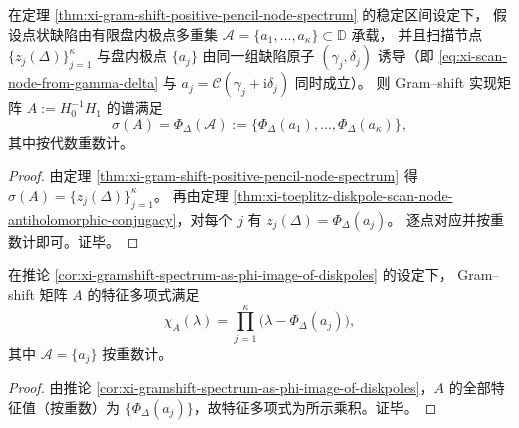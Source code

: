 \begin{corollary}\label{cor:xi-gramshift-spectrum-as-phi-image-of-diskpoles}
在定理 \ref{thm:xi-gram-shift-positive-pencil-node-spectrum} 的稳定区间设定下，
假设点状缺陷由有限盘内极点多重集 \(\mathcal A=\{a_1,\dots,a_\kappa\}\subset\mathbb{D}\) 承载，
并且扫描节点 \(\{z_j(\Delta)\}_{j=1}^{\kappa}\) 与盘内极点 \(\{a_j\}\) 由同一组缺陷原子 \((\gamma_j,\delta_j)\) 诱导（即 \eqref{eq:xi-scan-node-from-gamma-delta} 与 \(a_j=\mathcal{C}(\gamma_j+\mathrm{i}\delta_j)\) 同时成立）。
则 Gram--shift 实现矩阵 \(A:=H_0^{-1}H_1\) 的谱满足
\[
\sigma(A)=\Phi_\Delta(\mathcal A):=\{\Phi_\Delta(a_1),\dots,\Phi_\Delta(a_\kappa)\},
\]
其中按代数重数计。
\end{corollary}
\begin{proof}
由定理 \ref{thm:xi-gram-shift-positive-pencil-node-spectrum} 得 \(\sigma(A)=\{z_j(\Delta)\}_{j=1}^{\kappa}\)。
再由定理 \ref{thm:xi-toeplitz-diskpole-scan-node-antiholomorphic-conjugacy}，对每个 \(j\) 有 \(z_j(\Delta)=\Phi_\Delta(a_j)\)。
逐点对应并按重数计即可。证毕。
\end{proof}

\begin{proposition}\label{prop:xi-gramshift-charpoly-as-phi-image-of-diskpoles}
在推论 \ref{cor:xi-gramshift-spectrum-as-phi-image-of-diskpoles} 的设定下，
Gram--shift 矩阵 \(A\) 的特征多项式满足
\[
\chi_A(\lambda)=\prod_{j=1}^{\kappa}\bigl(\lambda-\Phi_\Delta(a_j)\bigr),
\]
其中 \(\mathcal A=\{a_j\}\) 按重数计。
\end{proposition}
\begin{proof}
由推论 \ref{cor:xi-gramshift-spectrum-as-phi-image-of-diskpoles}，\(A\) 的全部特征值（按重数）为 \(\{\Phi_\Delta(a_j)\}\)，故特征多项式为所示乘积。证毕。
\end{proof}

